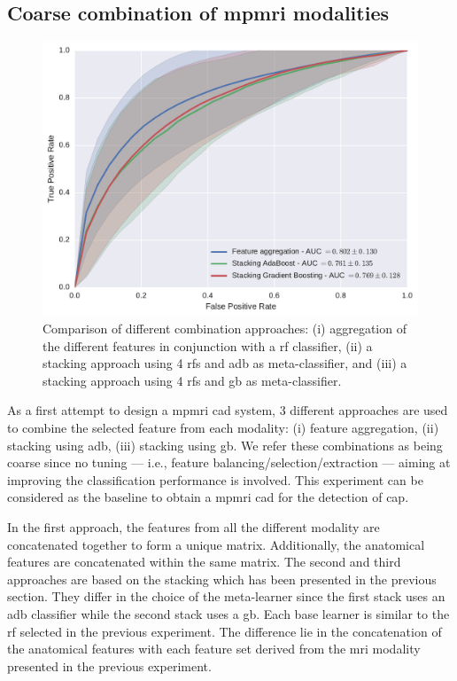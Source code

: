 \subsection{Coarse combination of \acs*{mpmri} modalities} \label{subsec:chp6:exp-res:Ex2}

\begin{figure}
  \centering
  \includegraphics[width=0.7\linewidth]{6_pipeline/figures/exp-2/comb_all.pdf}
  \caption[Comparison of different combination approaches.]{Comparison of different combination approaches: (i) aggregation of the different features in conjunction with a \acs*{rf} classifier, (ii) a stacking approach using 4 \acs*{rf}s and \acs*{adb} as meta-classifier, and (iii) a stacking approach using 4 \acs*{rf}s and \acs*{gb} as meta-classifier.}
  \label{fig:res-Exp2}
\end{figure}

As a first attempt to design a \ac{mpmri} \ac{cad} system, 3 different approaches are used to combine the selected feature from each modality:
(i) feature aggregation,
(ii) stacking using \ac{adb},
(iii) stacking using \ac{gb}.
We refer these combinations as being coarse since no tuning --- i.e., feature balancing/selection/extraction --- aiming at improving the classification performance is involved.
This experiment can be considered as the baseline to obtain a \ac{mpmri} \ac{cad} for the detection of \ac{cap}.

In the first approach, the features from all the different modality are concatenated together to form a unique matrix.
Additionally, the anatomical features are concatenated within the same matrix.
The second and third approaches are based on the stacking which has been presented in the previous section.
They differ in the choice of the meta-learner since the first stack uses an \ac{adb} classifier while the second stack uses a \ac{gb}.
Each base learner is similar to the \ac{rf} selected in the previous experiment.
The difference lie in the concatenation of the anatomical features with each feature set derived from the \ac{mri} modality presented in the previous experiment.

